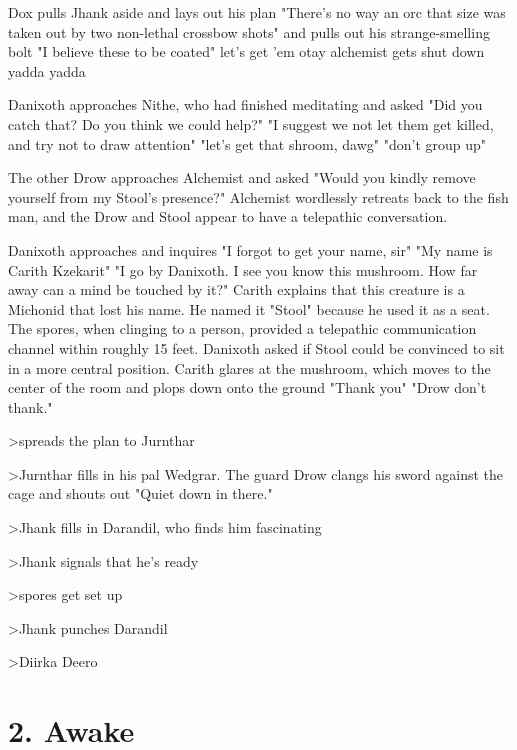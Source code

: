 \documentclass[letterpaper,10pt,twoside,twocolumn,openany]{book}
\begin{document}
Dox pulls Jhank aside and lays out his plan "There's no way an orc that size was taken out by two non-lethal crossbow shots" and pulls out his strange-smelling bolt "I believe these to be coated" let's get 'em otay alchemist gets shut down yadda yadda

Danixoth approaches Nithe, who had finished meditating and asked "Did you catch that? Do you think we could help?" "I suggest we not let them get killed, and try not to draw attention" "let's get that shroom, dawg" "don't group up"

The other Drow approaches Alchemist and asked "Would you kindly remove yourself from my Stool's presence?" Alchemist wordlessly retreats back to the fish man, and the Drow and Stool appear to have a telepathic conversation.

Danixoth approaches and inquires "I forgot to get your name, sir" "My name is Carith Kzekarit" "I go by Danixoth. I see you know this mushroom. How far away can a mind be touched by it?" Carith explains that this creature is a Michonid that lost his name. He named it "Stool" because he used it as a seat. The spores, when clinging to a person, provided a telepathic communication channel within roughly 15 feet. Danixoth asked if Stool could be convinced to sit in a more central position. Carith glares at the mushroom, which moves to the center of the room and plops down onto the ground "Thank you" "Drow don't thank."

>spreads the plan to Jurnthar

>Jurnthar fills in his pal Wedgrar. The guard Drow clangs his sword against the cage and shouts out "Quiet down in there."

>Jhank fills in Darandil, who finds him fascinating

>Jhank signals that he's ready 

>spores get set up

>Jhank punches Darandil

>Diirka Deero

\chapter{2. Awake}


\end{document}

